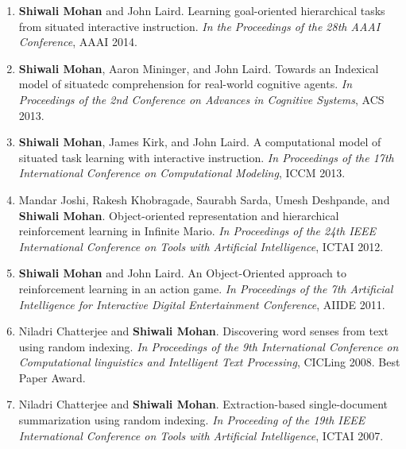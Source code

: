 \documentclass[margin,line,11pt]{res}
\begin{document}
\begin{resume}
\begin{enumerate}[label=\lbrack C\arabic*\rbrack,leftmargin=*]
                  \item \textbf{Shiwali Mohan} and John Laird. Learning goal-oriented hierarchical tasks from situated interactive instruction. \emph{In the Proceedings of the 28th AAAI Conference}, AAAI 2014.
                  \item \textbf{Shiwali Mohan}, Aaron Mininger, and John Laird. Towards an Indexical model of situatedc comprehension for real-world cognitive agents. \emph{In Proceedings of the 2nd Conference on Advances in Cognitive Systems}, ACS 2013.
                  \item \textbf{Shiwali Mohan}, James Kirk, and John Laird. A computational model of situated task learning with interactive instruction. \emph{In Proceedings of the 17th International Conference on Computational Modeling}, ICCM 2013.
                  \item Mandar Joshi, Rakesh Khobragade, Saurabh Sarda, Umesh Deshpande, and \textbf{Shiwali Mohan}. Object-oriented
                    representation and hierarchical reinforcement learning in Infinite Mario. \emph{In Proceedings of the 24th IEEE
                      International Conference on Tools with Artificial Intelligence}, ICTAI 2012.
                  \item \textbf{Shiwali Mohan} and John Laird. An Object-Oriented approach to reinforcement learning in an action game.
                    \emph{In Proceedings of the 7th Artificial Intelligence for Interactive Digital Entertainment Conference}, AIIDE 2011.
                  \item Niladri Chatterjee and \textbf{Shiwali Mohan}. Discovering word senses from text using random indexing. \emph{In
                    Proceedings of the 9th International Conference on Computational linguistics and Intelligent Text Processing},
                    CICLing 2008. Best Paper Award.
                  \item Niladri Chatterjee and \textbf{Shiwali Mohan}. Extraction-based single-document summarization using random
                    indexing. \emph{In Proceeding of the 19th IEEE International Conference on Tools with Artificial Intelligence}, ICTAI
                    2007.
                  \end{enumerate}


\end{resume}
\end{document}
